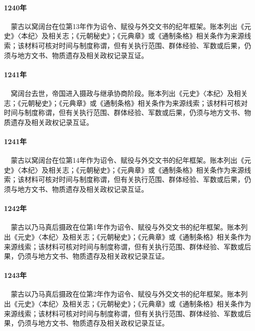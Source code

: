 \paragraph{1240年}　蒙古以窝阔台在位第13年作为诏令、赋役与外交文书的纪年框架。账本列出《元史》〈本纪〉及相关志；《元朝秘史》；《元典章》或《通制条格》相关条作为来源线索；该材料可核对时间与制度称谓，但有关执行范围、群体经验、军数或后果，仍须与地方文书、物质遗存及相关政权记录互证。

\paragraph{1241年}　窝阔台去世，帝国进入摄政与继承协商阶段。账本列出《元史》〈本纪〉及相关志；《元朝秘史》；《元典章》或《通制条格》相关条作为来源线索；该材料可核对时间与制度称谓，但有关执行范围、群体经验、军数或后果，仍须与地方文书、物质遗存及相关政权记录互证。

\paragraph{1241年}　蒙古以窝阔台在位第14年作为诏令、赋役与外交文书的纪年框架。账本列出《元史》〈本纪〉及相关志；《元朝秘史》；《元典章》或《通制条格》相关条作为来源线索；该材料可核对时间与制度称谓，但有关执行范围、群体经验、军数或后果，仍须与地方文书、物质遗存及相关政权记录互证。

\paragraph{1242年}　蒙古以乃马真后摄政在位第1年作为诏令、赋役与外交文书的纪年框架。账本列出《元史》〈本纪〉及相关志；《元朝秘史》；《元典章》或《通制条格》相关条作为来源线索；该材料可核对时间与制度称谓，但有关执行范围、群体经验、军数或后果，仍须与地方文书、物质遗存及相关政权记录互证。

\paragraph{1243年}　蒙古以乃马真后摄政在位第2年作为诏令、赋役与外交文书的纪年框架。账本列出《元史》〈本纪〉及相关志；《元朝秘史》；《元典章》或《通制条格》相关条作为来源线索；该材料可核对时间与制度称谓，但有关执行范围、群体经验、军数或后果，仍须与地方文书、物质遗存及相关政权记录互证。

